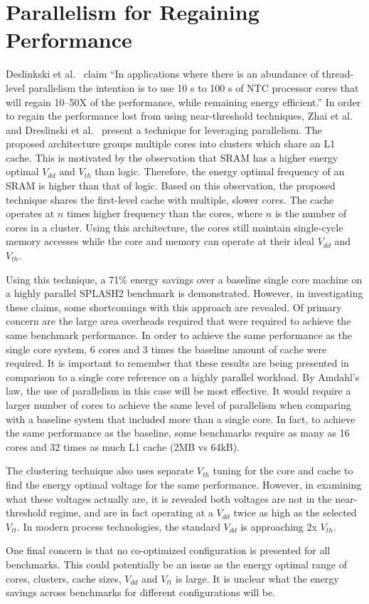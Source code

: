 \section{Parallelism for Regaining Performance}

Deslinkski et al.~\cite{dreslinski2010near} claim ``In applications where there is
an abundance of thread-level parallelism the intention is to use 10 s to 100 s
of NTC processor cores that will regain 10–50X of the performance, while
remaining energy efficient.'' In order to regain the performance lost from using
near-threshold techniques, Zhai et al.~\cite{Zhai:2007kn} and Dreslinski et
al.~\cite{Dreslinski:2007id} present a technique for leveraging parallelism.
The proposed architecture groups multiple cores into clusters which share an L1
cache. This is motivated by the observation that SRAM has a higher energy
optimal $V_{dd}$ and $V_{th}$ than logic. Therefore, the energy optimal
frequency of an SRAM is higher than that of logic. Based on this observation,
the proposed technique shares the first-level cache with multiple, slower cores.
The cache operates at $n$ times higher frequency than the cores, where $n$ is
the number of cores in a cluster.  Using this architecture, the cores still
maintain single-cycle memory accesses while the core and memory can operate at
their ideal $V_{dd}$ and $V_{th}$.

Using this technique, a 71\% energy savings over a baseline single core machine
on a highly parallel SPLASH2 benchmark is demonstrated. However, in
investigating these claims, some shortcomings with this approach are revealed.
Of primary concern are the large area overheads required that were required to
achieve the same benchmark performance. In order to achieve the same
performance as the single core system, 6 cores and 3 times the baseline amount
of cache were required. It is important to remember that these results are being
presented in comparison to a single core reference on a highly parallel
workload. By Amdahl's law, the use of parallelism in this case will be most
effective. It would require a larger number of cores to achieve the same level
of parallelism when comparing with a baseline system that included more than a
single core. In fact, to achieve the same performance as the baseline, some
benchmarks require as many as 16 cores and 32 times as much L1 cache (2MB vs
64kB).

The clustering technique also uses separate $V_{th}$ tuning for the core and
cache to find the energy optimal voltage for the same performance. However, in
examining what these voltages actually are, it is revealed both voltages are not
in the near-threshold regime, and are in fact operating at a $V_{dd}$ twice as
high as the selected $V_{tt}$. In modern process technologies, the standard
$V_{dd}$ is approaching 2x $V_{th}$.

One final concern is that no co-optimized configuration is presented for all
benchmarks. This could potentially be an issue as the energy optimal range of
cores, clusters, cache sizes, $V_{dd}$ and $V_{tt}$ is large. It is unclear what
the energy savings across benchmarks for different configurations will be.
